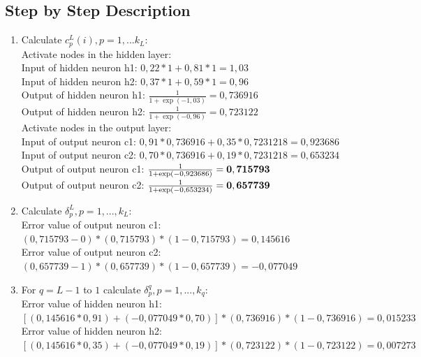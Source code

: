 \begin{appendix}
\section{Step by Step Description}

\begin{enumerate}
    \item Calculate $c^L_p(i), p=1,...k_L$: \ \\

	Activate nodes in the hidden layer: \\

	Input of hidden neuron h1: $0,22*1 + 0,81*1 = 1,03$ \\
	Input of hidden neuron h2: $0,37*1 + 0,59*1 = 0,96$ \\
	Output of hidden neuron h1: $\frac{1}{1+\exp(-1,03)} = 0,736916$ \\
	Output of hidden neuron h2: $\frac{1}{1+\exp(-0,96)} = 0,723122$ \\

	Activate nodes in the output layer: \\

	Input of output neuron c1: $0,91*0,736916 + 0,35*0,7231218 = 0,923686$\\
	Input of output neuron c2: $0,70*0,736916 + 0,19*0,7231218 = 0,653234$\\
	Output of output neuron c1: $\frac{1}{1+\exp(-0,923686)} = {\bf 0,715793}$\\
	Output of output neuron c2: $\frac{1}{1+\exp(-0,653234)} = {\bf 0,657739}$\\


	\item Calculate $\delta^L_p, p=1,...,k_L$: \ \\

	Error value of output neuron c1: $(0,715793 - 0) * (0,715793) * (1 - 0,715793) = 0,145616$ \\
	Error value of output neuron c2: $(0,657739 - 1) * (0,657739) * (1 - 0,657739) = -0,077049$ \\

	\item For $q = L - 1$ to $1$ calculate $\delta^q_p, p=1,...,k_q$: \ \\

	Error value of hidden neuron h1: $ [(0,145616 * 0,91) + (-0,077049 * 0,70)] * (0,736916) * (1 - 0,736916) = 0,015233$ \\
	Error value of hidden neuron h2: $ [(0,145616 * 0,35) + (-0,077049 * 0,19)] * (0,723122) * (1 - 0,723122) = 0,007273$ \\


\end{enumerate}
\end{appendix}
